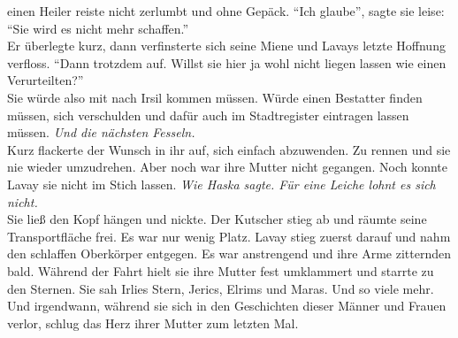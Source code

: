 einen Heiler reiste nicht zerlumbt und ohne Gepäck. ``Ich glaube'', sagte sie leise: ``Sie wird 
es nicht mehr schaffen.''\\
Er überlegte kurz, dann verfinsterte sich seine Miene und Lavays letzte Hoffnung verfloss. ``Dann 
trotzdem auf. Willst sie hier ja wohl nicht liegen lassen wie einen Verurteilten?''\\
Sie würde also mit nach Irsil kommen müssen. Würde einen Bestatter finden müssen, sich verschulden 
und dafür auch im Stadtregister eintragen lassen müssen. \textit{Und die nächsten Fesseln.}\\
Kurz flackerte der Wunsch in ihr auf, sich einfach abzuwenden. Zu rennen und sie nie wieder 
umzudrehen. Aber noch war ihre Mutter nicht gegangen. Noch konnte Lavay sie nicht im Stich lassen. 
\textit{Wie Haska sagte. Für eine Leiche lohnt es sich nicht.}\\
Sie ließ den Kopf hängen und nickte. Der Kutscher stieg ab und räumte seine Transportfläche frei. 
Es war nur wenig Platz. Lavay stieg zuerst darauf und nahm den schlaffen Oberkörper entgegen. Es 
war anstrengend und ihre Arme zitternden bald. Während der Fahrt hielt sie ihre Mutter fest 
umklammert und starrte zu den Sternen. Sie sah Irlies Stern, Jerics, Elrims und Maras. Und so viele 
mehr. Und irgendwann, während sie sich in den Geschichten dieser Männer und Frauen verlor, schlug 
das Herz ihrer Mutter zum letzten Mal.\\

